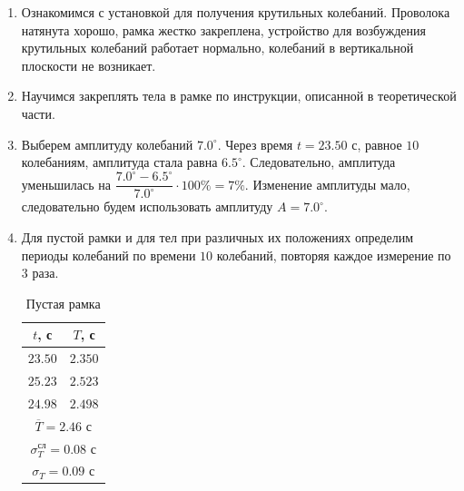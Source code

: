 \documentclass[a4paper,12pt]{article}
\begin{document}
\begin{enumerate}
    \item Ознакомимся с установкой для получения крутильных колебаний. Проволока натянута хорошо, рамка жестко закреплена, устройство для возбуждения крутильных колебаний работает нормально, колебаний в вертикальной плоскости не возникает.
    \item Научимся закреплять тела в рамке по инструкции, описанной в теоретической части.
    \item Выберем амплитуду колебаний $7.0^{\circ}$. Через время $t = 23.50$ с, равное $10$ колебаниям, амплитуда стала равна $6.5^{\circ}$. Следовательно, амплитуда уменьшилась на $\dfrac{7.0^{\circ} - 6.5^{\circ}}{7.0^{\circ}}\cdot 100\% = 7\%$. Изменение амплитуды мало, следовательно будем использовать амплитуду $A = 7.0^{\circ}$.
    \item Для пустой рамки и для тел при различных их положениях определим периоды колебаний по времени $10$ колебаний, повторяя каждое измерение по $3$ раза.
    \begin{table}[!h]
        \centering
        \begin{tabular}{|c|c|} \hline
            $t$, с & $T$, с \\ \hline
            $23.50$ & $2.350$ \\ \hline
            $25.23$ & $2.523$ \\ \hline
            $24.98$ & $2.498$ \\ \hline
            \multicolumn{2}{|c|}{$\overline{T} = 2.46$ с} \\ 
            \multicolumn{2}{|c|}{$\sigma_T^{\text{сл}} = 0.08$ с} \\
            \multicolumn{2}{|c|}{$\sigma_T = 0.09$ с} \\ \hline
        \end{tabular}
        \caption{Пустая рамка}
    \end{table}


\end{enumerate}
\end{document}
